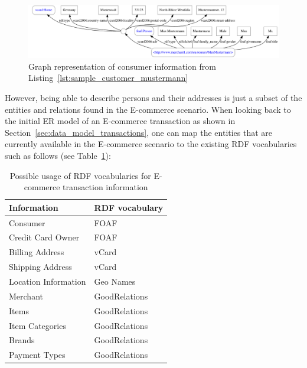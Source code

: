 
\begin{figure}[H]
	\centering
		\includegraphics[width=\columnwidth]{images/sample_customer_mustermann.pdf}
	\caption{Graph representation of consumer information from Listing~\ref{lst:sample_customer_mustermann}}
\label{fig:images_sample_customer}
\end{figure}

However, being able to describe persons and their addresses is just a subset of the entities and relations found in the \gls{E-commerce} scenario. When looking back to the initial \gls{ER} model of an \gls{E-commerce} transaction as shown in Section~\ref{sec:data_model_transactions}, one can map the entities that are currently available in the \gls{E-commerce} scenario to the existing \gls{RDF} vocabularies such as follows (see Table~\ref{tab:map_tx_rdf_vocab}): \@

\begin{table}[H]
\centering
\begin{tabular}{p{5cm}l}
\hline
\textbf{Information} & \textbf{RDF vocabulary} \\
\hline
Consumer & FOAF \\
\hline
Credit Card Owner & FOAF \\
\hline
Billing Address & vCard \\
\hline
Shipping Address & vCard \\
\hline
Location Information & Geo Names \\
\hline
Merchant & GoodRelations \\
\hline
Items & GoodRelations \\
\hline
Item Categories & GoodRelations \\
\hline
Brands & GoodRelations \\
\hline
Payment Types & GoodRelations \\
\hline
\end{tabular}
\caption{Possible usage of \gls{RDF} vocabularies for \gls{E-commerce} transaction information}
\label{tab:map_tx_rdf_vocab}
\end{table}

